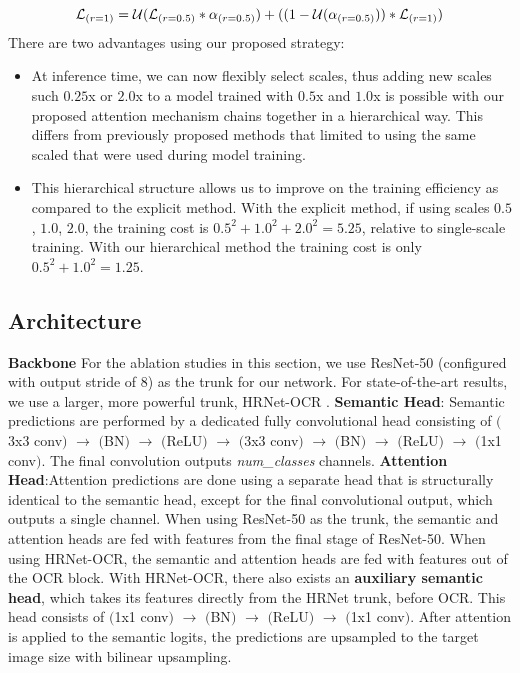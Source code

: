 \documentclass{article}
\begin{document}
\begin{equation}
    \centering
   \mathcal{L}_{\boldmath{{(r=1)}}} = \mathcal{U}(\mathcal{L}_{(r=0.5)} * \alpha_{(r=0.5)}) + ((1-\mathcal{U}(\alpha_{(r=0.5)})) * \mathcal{L}_{(r=1)} )
\end{equation}
There are two advantages using our proposed strategy:
\begin{itemize}
 \item At inference time, we can now flexibly select scales, thus adding new scales such $0.25$x or $2.0$x to a model trained with $0.5$x and $1.0$x  is possible with our proposed attention mechanism chains together in a hierarchical way. This differs from previously proposed methods that limited to using the same scaled that were used during model training.
 
 \item This hierarchical structure allows us to improve on the training efficiency as compared to the explicit method. With the explicit method, if using scales $0.5$, $1.0$, $2.0$, the training cost is $0.5^2 + 1.0^2 + 2.0^2 = 5.25$, relative to single-scale training. With our hierarchical method the training cost is only $0.5^2 + 1.0^2 = 1.25$.
\end{itemize}
 
 \subsection{Architecture}
 \textbf{Backbone} For the ablation studies in this section, we use ResNet-50 \cite{he2016deep} (configured with output stride of 8) as the trunk for our network. For state-of-the-art results, we use a larger, more powerful trunk, HRNet-OCR \cite{yuan2019objectcontextual}. \textbf{Semantic Head}: Semantic predictions are performed by a dedicated fully convolutional head consisting of $($3x3 conv$)$ $\rightarrow$ $($BN$)$ $\rightarrow$ $($ReLU$)$  $\rightarrow$ $($3x3 conv$)$ $\rightarrow$ $($BN$)$ $\rightarrow$ $($ReLU$)$ $\rightarrow$ $($1x1 conv$)$. The final convolution outputs \textit{num\_classes} channels. \textbf{Attention Head}:Attention predictions are done using a separate head that is structurally identical to the semantic head, except for the final convolutional output, which outputs a single channel. When using ResNet-50 as the trunk, the semantic and attention heads are fed with features from the final stage of ResNet-50. When using HRNet-OCR, the semantic and attention heads are fed with features out of the OCR block. With HRNet-OCR, there also exists an \textbf{auxiliary semantic head}, which takes its features directly from the HRNet trunk, before OCR. This head consists of $($1x1 conv$)$ $\rightarrow$ $($BN$)$ $\rightarrow$ $($ReLU$)$ $\rightarrow$ $($1x1 conv$)$. After attention is applied to the semantic logits, the predictions are upsampled to the target image size with bilinear upsampling.
 
\end{document}
